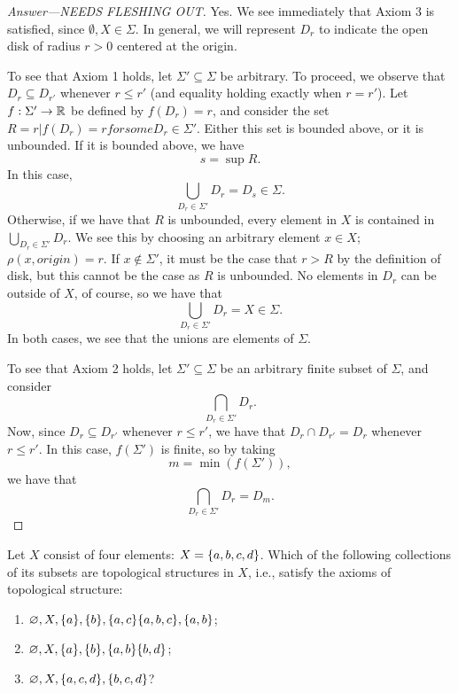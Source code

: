 \begin{proof}[Answer---NEEDS FLESHING OUT]
    Yes. We see immediately that Axiom 3 is satisfied, since $\emptyset, X \in
    \Sigma$. In general, we will represent $D_r$ to indicate the open disk of
    radius $r > 0$ centered at the origin.

    To see that Axiom 1 holds, let $\Sigma' \subseteq \Sigma$ be arbitrary. To
    proceed, we observe that $D_r \subseteq D_{r'}$ whenever $r \leq r'$ (and
    equality holding exactly when $r = r'$). Let $f : \Sigma' \to \mathbb{R}$ be
    defined by $f(D_r) = r$, and consider the set $R = {r | f(D_r) = r for some D_r \in \Sigma'}$. Either this set is
    bounded above, or it is unbounded. If it is bounded above, we have
    \[
        s = \sup R.
    \]
    In this case,
    \[
        \bigcup_{D_r \in \Sigma'} D_r = D_s \in \Sigma.
    \]
    Otherwise, if we have that $R$ is unbounded, every element in $X$ is contained in $\bigcup_{D_r \in \Sigma'} D_r$. We see this by choosing an arbitrary element $x \in X$;  $\rho(x, origin) = r$. If $x \not \in \Sigma'$, it must be the case that $r > R$ by the definition of disk, but this cannot be the case as $R$ is unbounded. No elements in $D_r$ can be outside of $X$, of course, so we have that 
    \[
        \bigcup_{D_r \in \Sigma'} D_r = X \in \Sigma.
    \]
    In both cases, we see that the unions are elements of $\Sigma$.

    To see that Axiom 2 holds, let $\Sigma' \subseteq \Sigma$ be an arbitrary
    finite subset of $\Sigma$, and consider
    \[
        \bigcap_{D_r \in \Sigma'} D_r.
    \]
    Now, since $D_r \subseteq D_{r'}$ whenever $r \leq r'$, we have that $D_r
    \cap D_{r'} = D_r$ whenever $ r \leq r'$. In this case, $f(\Sigma')$ is
    finite, so by taking
    \[
        m = \min(f(\Sigma')),
    \]
    we have that
    \[
        \bigcap_{D_r \in \Sigma'} D_r = D_m.
    \]
\end{proof}

\begin{minorEx} %
    Let $X$ consist of four elements: $X = \{a, b, c, d\}$. Which of the
    following collections of its subsets are topological structures in $X$,
    i.e., satisfy the axioms of topological structure:
    \begin{enumerate}
        \item $\varnothing, X, \{a\}, \{b\}, \{a,c\} \{a,b,c\},
            \{a,b\}$;
        \item $\varnothing, X, \{a\}, \{b\}, \{a,b\} \{b,d\}$;
        \item $\varnothing, X, \{a,c,d\}, \{b,c,d\}$?
    \end{enumerate}
\end{minorEx}

